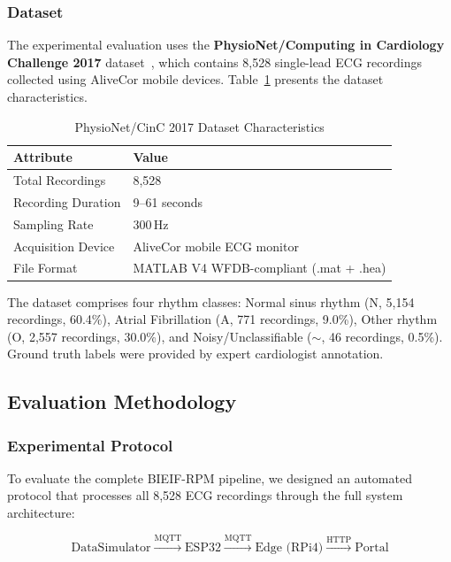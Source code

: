 \subsubsection{Dataset}

The experimental evaluation uses the \textbf{PhysioNet/Computing in Cardiology Challenge 2017} dataset~\cite{clifford2017af}, which contains 8,528 single-lead ECG recordings collected using AliveCor mobile devices. Table~\ref{tab:dataset} presents the dataset characteristics.

\begin{table}[htbp]
\centering
\caption{PhysioNet/CinC 2017 Dataset Characteristics}
\label{tab:dataset}
\begin{tabular}{@{}ll@{}}
\toprule
\textbf{Attribute} & \textbf{Value} \\
\midrule
Total Recordings & 8,528 \\
Recording Duration & 9--61 seconds \\
Sampling Rate & 300\,Hz \\
Acquisition Device & AliveCor mobile ECG monitor \\
File Format & MATLAB V4 WFDB-compliant (.mat + .hea) \\
\bottomrule
\end{tabular}
\end{table}

The dataset comprises four rhythm classes: Normal sinus rhythm (N, 5,154 recordings, 60.4\%), Atrial Fibrillation (A, 771 recordings, 9.0\%), Other rhythm (O, 2,557 recordings, 30.0\%), and Noisy/Unclassifiable ($\sim$, 46 recordings, 0.5\%). Ground truth labels were provided by expert cardiologist annotation.

\subsection{Evaluation Methodology}
\label{subsec:methodology}

\subsubsection{Experimental Protocol}

To evaluate the complete BIEIF-RPM pipeline, we designed an automated protocol that processes all 8,528 ECG recordings through the full system architecture:

\begin{equation}
\text{DataSimulator} \xrightarrow{\text{MQTT}} \text{ESP32} \xrightarrow{\text{MQTT}} \text{Edge (RPi4)} \xrightarrow{\text{HTTP}} \text{Portal}
\label{eq:pipeline}
\end{equation}

